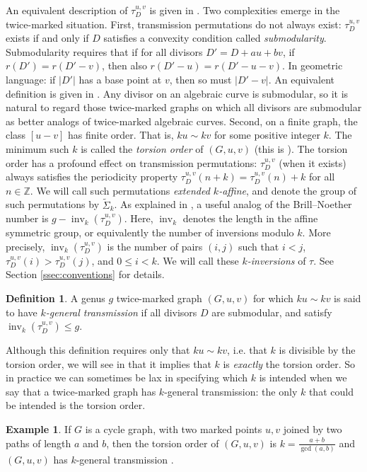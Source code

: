 \documentclass[11pt]{article}
\theoremstyle{definition}
\newtheorem{defi}[theo]{Definition}
\newtheorem{example}[theo]{Example}
\numberwithin{equation}{section}
\newcommand{\Z}{\mathbb{Z}}
\newcommand{\inv}{\operatorname{inv}}
\newcommand{\eaf}[1]{\widetilde{\Sigma}_{#1}}
\newcommand{\tauD}{\tau^{u,v}_D}
\begin{document}
An equivalent description of $\tauD$ is given in .
Two complexities emerge in the twice-marked situation. First, transmission permutations do not always exist: $\tauD$ exists if and only if $D$ satisfies a convexity condition called \emph{submodularity}. 
Submodularity requires that if for all divisors $D' = D+au+bv$, if $r(D') = r(D'-v)$, then also $r(D'-u) = r(D'-u-v)$. 
In geometric language: if $|D'|$ has a base point at $v$, then so must $|D'-v|$. An equivalent definition is given in .
Any divisor on an algebraic curve is submodular, so it is natural to regard those twice-marked graphs on which all divisors are submodular as better analogs of twice-marked algebraic curves. 
Second, on a finite graph, the class $[u-v]$ has finite order. That is, $ku \sim kv$ for some positive integer $k$. The minimum such $k$ is called the \emph{torsion order} of $(G,u,v)$ (this is ). The torsion order has a profound effect on transmission permutations: $\tauD$ (when it exists) always satisfies the periodicity property $\tauD(n+k) = \tauD(n)+k$ for all $n \in \Z$. We will call such permutations \emph{extended $k$-affine}, and denote the group of such permutations by $\eaf{k}$. As explained in \cite{Pfl22}, a useful analog of the Brill--Noether number is $g - \inv_k(\tauD)$. Here, $\inv_k$ denotes the length in the affine symmetric group, or equivalently the number of inversions modulo $k$. More precisely, $\inv_k(\tauD)$ is the number of pairs $(i,j)$ such that $i<j$, $\tauD(i) > \tauD(j)$, and $0 \leq i < k$. We will call these \emph{$k$-inversions} of $\tau$. See Section \ref{ssec:conventions} for details.

\begin{defi}
A genus $g$ twice-marked graph $(G,u,v)$ for which $ku \sim kv$ is said to have \emph{$k$-general transmission} if all divisors $D$ are submodular, and satisfy $\inv_k(\tauD) \leq g$.
\end{defi}

Although this definition requires only that $k u \sim kv$, i.e. that $k$ is divisible by the torsion order, we will see in  that it implies that $k$ is \emph{exactly} the torsion order. So in practice we can sometimes be lax in specifying which $k$ is intended when we say that a twice-marked graph has $k$-general transmission: the only $k$ that could be intended is the torsion order.

\begin{example}\label{eg:cycle}
    If $G$ is a cycle graph, with two marked points $u,v$ joined by two paths of length $a$ and $b$, then the torsion order of $(G,u,v)$ is $k =\frac{a+b}{\gcd(a,b)}$ and $(G,u,v)$ has $k$-general transmission \cite[\S 2.1]{Pfl22}.
\end{example}
\end{document}
